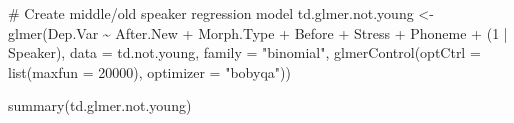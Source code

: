 \documentclass[
  10pt,
  letterpaper]{article}
\newenvironment{Shaded}{\begin{snugshade}}{\end{snugshade}}
\newcommand{\AttributeTok}[1]{\textcolor[rgb]{0.40,0.45,0.13}{#1}}
\newcommand{\CommentTok}[1]{\textcolor[rgb]{0.37,0.37,0.37}{#1}}
\newcommand{\DecValTok}[1]{\textcolor[rgb]{0.68,0.00,0.00}{#1}}
\newcommand{\FunctionTok}[1]{\textcolor[rgb]{0.28,0.35,0.67}{#1}}
\newcommand{\NormalTok}[1]{\textcolor[rgb]{0.00,0.23,0.31}{#1}}
\newcommand{\OtherTok}[1]{\textcolor[rgb]{0.00,0.23,0.31}{#1}}
\newcommand{\SpecialCharTok}[1]{\textcolor[rgb]{0.37,0.37,0.37}{#1}}
\newcommand{\StringTok}[1]{\textcolor[rgb]{0.13,0.47,0.30}{#1}}
\begin{document}
\begin{Shaded}
\begin{Highlighting}[]
\CommentTok{\# Create middle/old speaker regression model}
\NormalTok{td.glmer.not.young }\OtherTok{\textless{}{-}} \FunctionTok{glmer}\NormalTok{(Dep.Var }\SpecialCharTok{\textasciitilde{}}\NormalTok{ After.New }\SpecialCharTok{+}\NormalTok{ Morph.Type }\SpecialCharTok{+}
\NormalTok{    Before }\SpecialCharTok{+}\NormalTok{ Stress }\SpecialCharTok{+}\NormalTok{ Phoneme }\SpecialCharTok{+}\NormalTok{ (}\DecValTok{1} \SpecialCharTok{|}\NormalTok{ Speaker), }\AttributeTok{data =}\NormalTok{ td.not.young,}
    \AttributeTok{family =} \StringTok{"binomial"}\NormalTok{, }\FunctionTok{glmerControl}\NormalTok{(}\AttributeTok{optCtrl =} \FunctionTok{list}\NormalTok{(}\AttributeTok{maxfun =} \DecValTok{20000}\NormalTok{),}
        \AttributeTok{optimizer =} \StringTok{"bobyqa"}\NormalTok{))}

\FunctionTok{summary}\NormalTok{(td.glmer.not.young)}
\end{Highlighting}
\end{Shaded}
\end{document}
